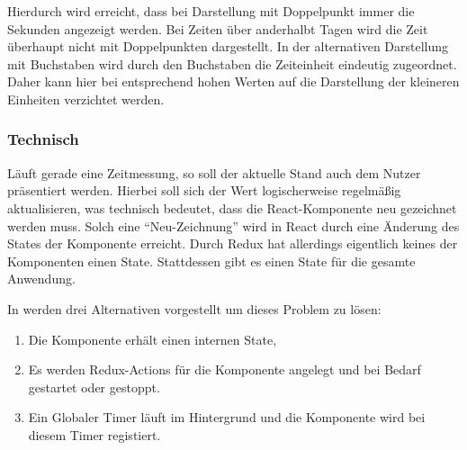 

Hierdurch wird erreicht, dass bei Darstellung mit Doppelpunkt immer die Sekunden angezeigt werden.
Bei Zeiten über anderhalbt Tagen wird die Zeit überhaupt nicht mit Doppelpunkten dargestellt.
In der alternativen Darstellung mit Buchstaben wird durch den Buchstaben die Zeiteinheit eindeutig zugeordnet.
Daher kann hier bei entsprechend hohen Werten auf die Darstellung der kleineren Einheiten verzichtet werden.

\subsubsection{Technisch}
Läuft gerade eine Zeitmessung, so soll der aktuelle Stand auch dem Nutzer präsentiert werden.
Hierbei soll sich der Wert logischerweise regelmäßig aktualisieren,
was technisch bedeutet, dass die React-Komponente neu gezeichnet werden muss.
Solch eine \enquote{Neu-Zeichnung} wird in React durch eine Änderung des States der Komponente erreicht.
Durch Redux hat allerdings eigentlich keines der Komponenten einen State.
Stattdessen gibt es einen State für die gesamte Anwendung.

In \cite{Timersin85:online} werden drei Alternativen vorgestellt um dieses Problem zu lösen:
\begin{enumerate}
    \item Die Komponente erhält einen internen State,
    \item Es werden Redux-Actions für die Komponente angelegt und bei Bedarf gestartet oder gestoppt.
    \item Ein Globaler Timer läuft im Hintergrund und die Komponente wird bei diesem Timer registiert.
\end{enumerate}

